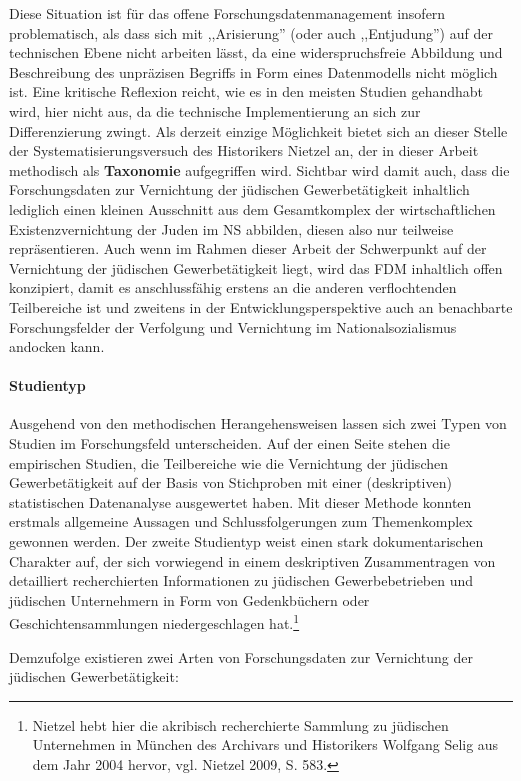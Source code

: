 Diese Situation ist für das offene Forschungsdatenmanagement insofern problematisch, als dass sich mit ,,Arisierung'' (oder auch ,,Entjudung'') auf der technischen Ebene nicht arbeiten lässt, da eine widerspruchsfreie Abbildung und Beschreibung des unpräzisen Begriffs in Form eines Datenmodells nicht möglich ist. Eine kritische Reflexion reicht, wie es in den meisten Studien gehandhabt wird, hier nicht aus, da die technische Implementierung an sich zur Differenzierung zwingt. Als derzeit einzige Möglichkeit bietet sich an dieser Stelle der Systematisierungsversuch des Historikers Nietzel an, der in dieser Arbeit methodisch als \textbf{Taxonomie} aufgegriffen wird. Sichtbar wird damit auch, dass die Forschungsdaten zur Vernichtung der jüdischen Gewerbetätigkeit inhaltlich lediglich einen kleinen Ausschnitt aus dem Gesamtkomplex der wirtschaftlichen Existenzvernichtung der Juden im NS abbilden, diesen also nur teilweise repräsentieren. Auch wenn im Rahmen dieser Arbeit der Schwerpunkt auf der Vernichtung der jüdischen Gewerbetätigkeit liegt, wird das FDM inhaltlich offen konzipiert, damit es anschlussfähig erstens an die anderen verflochtenden Teilbereiche ist und zweitens in der Entwicklungsperspektive auch an benachbarte Forschungsfelder der Verfolgung und Vernichtung im Nationalsozialismus andocken kann. 

\paragraph{Studientyp}Ausgehend von den methodischen Herangehensweisen lassen sich zwei Typen von Studien im Forschungsfeld unterscheiden. Auf der einen Seite stehen die empirischen Studien, die Teilbereiche wie die Vernichtung der jüdischen Gewerbetätigkeit auf der Basis von Stichproben mit einer (deskriptiven) statistischen Datenanalyse ausgewertet haben. Mit dieser Methode konnten erstmals allgemeine Aussagen und Schlussfolgerungen zum Themenkomplex gewonnen werden. Der zweite Studientyp weist einen stark dokumentarischen Charakter auf, der sich vorwiegend in einem deskriptiven Zusammentragen von detailliert recherchierten Informationen zu jüdischen Gewerbebetrieben und jüdischen Unternehmern in Form von Gedenkbüchern oder Geschichtensammlungen niedergeschlagen hat.\footnote{Nietzel hebt hier die akribisch recherchierte Sammlung zu jüdischen Unternehmen in München des Archivars und Historikers Wolfgang Selig aus dem Jahr 2004 hervor, vgl. Nietzel 2009, S. 583.}

Demzufolge existieren zwei Arten von Forschungsdaten zur Vernichtung der jüdischen Gewerbetätigkeit:

